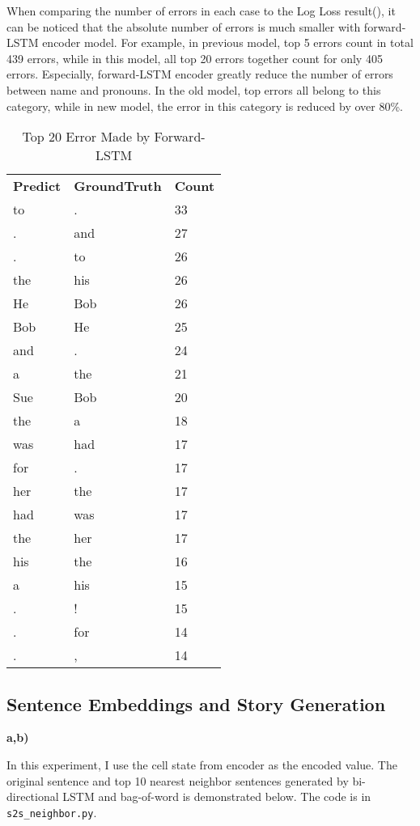 \documentclass{article}
\begin{document}
When comparing the number of errors in each case to the Log Loss result(), it can be noticed that the absolute number of errors is much smaller with forward-LSTM encoder model. For example, in previous model, top 5 errors count in total 439 errors, while in this model, all top 20 errors together count for only 405 errors. Especially, forward-LSTM encoder greatly reduce the number of errors between name and pronouns. In the old model, top errors all belong to this category, while in new model, the error in this category is reduced by over 80\%.
\begin{table}
\centering
\begin{tabular}{l|l|l}
\textbf{Predict} & \textbf{GroundTruth} & \textbf{Count}\\
to&.&33\\\hline
.&and&27\\\hline
.&to&26\\\hline
the&his&26\\\hline
He&Bob&26\\\hline
Bob&He&25\\\hline
and&.&24\\\hline
a&the&21\\\hline
Sue&Bob&20\\\hline
the&a&18\\\hline
was&had&17\\\hline
for&.&17\\\hline
her&the&17\\\hline
had&was&17\\\hline
the&her&17\\\hline
his&the&16\\\hline
a&his&15\\\hline
.&!&15\\\hline
.&for&14\\\hline
.&,&14\\\hline
\end{tabular}
\caption{Top 20 Error Made by Forward-LSTM}
\label{tab:lstm_top20}
\end{table}


\subsection{Sentence Embeddings and Story Generation}
\textbf{a,b)}

In this experiment, I use the cell state from encoder as the encoded value. The original sentence and top 10 nearest neighbor sentences generated by bi-directional LSTM and bag-of-word is demonstrated below. The code is in \texttt{s2s\_neighbor.py}.
\end{document}
